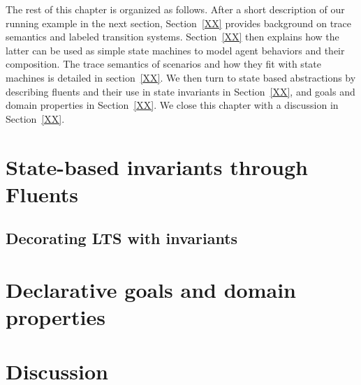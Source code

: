 The rest of this chapter is organized as follows. After a short description of our running example in the next section, Section~\ref{XX} provides background on trace semantics and labeled transition systems. Section~\ref{XX} then explains how the latter can be used as simple state machines to model agent behaviors and their composition. The trace semantics of scenarios and how they fit with state machines is detailed in section~\ref{XX}. We then turn to state based abstractions by describing fluents and their use in state invariants in Section~\ref{XX}, and goals and domain properties in Section~\ref{XX}. We close this chapter with a discussion in Section~\ref{XX}. 





\section{State-based invariants through Fluents}

\subsection{Decorating LTS with invariants}

\section{Declarative goals and domain properties}

\section{Discussion\label{section:background-discussion}}
